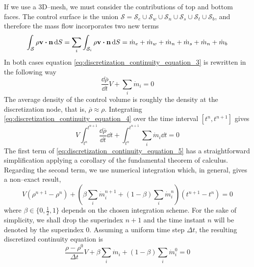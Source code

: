 If we use a 3D--mesh, we must consider the contributions of top and bottom faces. The control surface is the union $\mathcal{S} = \mathcal{S}_e \cup \mathcal{S}_w \cup \mathcal{S}_n \cup \mathcal{S}_s \cup \mathcal{S}_t \cup \mathcal{S}_b$, and therefore the mass flow incorporates two new terms
\begin{equation}
	\int_{\mathcal{S}} \rho \vb{v} \vdot \vb{n} \dd{S} = 
	\sum_{i} \int_{\mathcal{S}_i} \rho \vb{v} \vdot \vb{n} \dd{S} = 
	\dot{m}_e + \dot{m}_w + \dot{m}_n + \dot{m}_s + \dot{m}_n + \dot{m}_b
\end{equation}
In both cases equation \eqref{eq:discretization_continuity_equation_3} is rewritten in the following way
\begin{equation} \label{eq:discretization_continuity_equation_4}
	\frac{\dd \overline{\rho}}{\dd{t}} V + \sum_i \dot{m}_i = 0
\end{equation}
The average density of the control volume is roughly the density at the discretization node, that is, $\overline{\rho} \approx \rho$. Integrating \eqref{eq:discretization_continuity_equation_4} over the time interval $[t^n, t^{n+1}]$ gives
\begin{equation} \label{eq:discretization_continuity_equation_5}
	V \int_{t^n}^{t^{n+1}} \frac{\dd \overline{\rho}}{\dd{t}} \dd{t} + 
	\int_{t^n}^{t^{n+1}} \sum_i \dot{m}_i \dd{t} = 0
\end{equation}
The first term of \eqref{eq:discretization_continuity_equation_5} has a straightforward simplification applying a corollary of the fundamental theorem of calculus. Regarding the second term, we use numerical integration which, in general, gives a non--exact result,
\begin{equation} \label{eq:discretization_continuity_equation_6}
	V (\rho^{n+1} - \rho^n) + 
	\left( \beta \sum_i \dot{m}_i^{n+1} + (1 - \beta) \sum_i \dot{m}_i^{n} \right) (t^{n+1} - t^n) = 0
\end{equation}
where $\beta \in \{ 0, \frac{1}{2}, 1 \}$ depends on the chosen integration scheme. For the sake of simplicity, we shall drop the superindex $n+1$ and the time instant $n$ will be denoted by the superindex $0$. Assuming a uniform time step $\Delta t$, the resulting discretized continuity equation is
\begin{equation}
	\frac{\rho - \rho^0}{\Delta t} V + \beta \sum_i \dot{m}_i + (1 - \beta) \sum_i \dot{m}_i^0 = 0
\end{equation}





